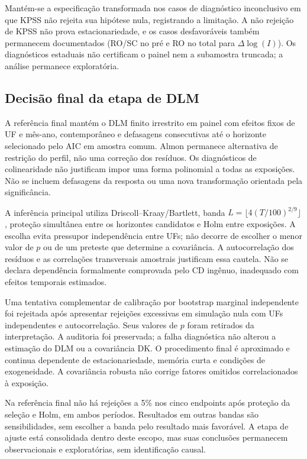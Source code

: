 Mantém-se a especificação transformada nos casos de diagnóstico inconclusivo em que KPSS não rejeita sua hipótese nula, registrando a limitação. A não rejeição de KPSS não prova estacionariedade, e os casos desfavoráveis também permanecem documentados (RO/SC no pré e RO no total para $\Delta\log(I)$). Os diagnósticos estaduais não certificam o painel nem a subamostra truncada; a análise permanece exploratória.

\subsection{Decisão final da etapa de DLM}
A referência final mantém o DLM finito irrestrito em painel com efeitos fixos de UF e mês-ano, contemporâneo e defasagens consecutivas até o horizonte selecionado pelo AIC em amostra comum. Almon permanece alternativa de restrição do perfil, não uma correção dos resíduos. Os diagnósticos de colinearidade não justificam impor uma forma polinomial a todas as exposições. Não se incluem defasagens da resposta ou uma nova transformação orientada pela significância.

A inferência principal utiliza Driscoll--Kraay/Bartlett, banda $L=\lfloor4(T/100)^{2/9}\rfloor$, proteção simultânea entre os horizontes candidatos e Holm entre exposições. A escolha evita pressupor independência entre UFs; não decorre de escolher o menor valor de $p$ ou de um preteste que determine a covariância. A autocorrelação dos resíduos e as correlações transversais amostrais justificam essa cautela. Não se declara dependência formalmente comprovada pelo CD ingênuo, inadequado com efeitos temporais estimados.

Uma tentativa complementar de calibração por bootstrap marginal independente foi rejeitada após apresentar rejeições excessivas em simulação nula com UFs independentes e autocorrelação. Seus valores de $p$ foram retirados da interpretação. A auditoria foi preservada; a falha diagnóstica não alterou a estimação do DLM ou a covariância DK. O procedimento final é aproximado e continua dependente de estacionariedade, memória curta e condições de exogeneidade. A covariância robusta não corrige fatores omitidos correlacionados à exposição.

Na referência final não há rejeições a 5\% nos cinco endpoints após proteção da seleção e Holm, em ambos períodos. Resultados em outras bandas são sensibilidades, sem escolher a banda pelo resultado mais favorável. A etapa de ajuste está consolidada dentro deste escopo, mas suas conclusões permanecem observacionais e exploratórias, sem identificação causal.

